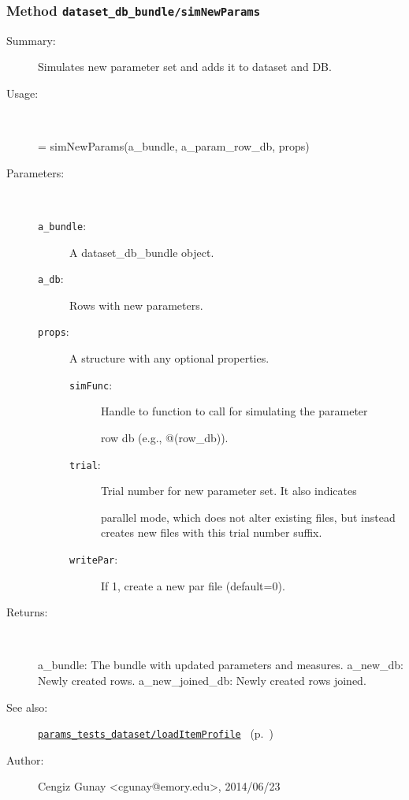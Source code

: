 \subsubsection[Method \texttt{simNewParams}]{Method \texttt{dataset\_db\_bundle/simNewParams}}%
%
\label{ref_dataset_db_bundle__simNewParams}%
\hypertarget{ref_dataset_db_bundle__simNewParams}{}%
\begin{description}
\item[Summary:]Simulates new parameter set and adds it to dataset and DB.
%
\item[Usage:]~%
\begin{lyxcode}%
[a\_bundle, a\_new\_db, a\_new\_joined\_db] = simNewParams(a\_bundle, a\_param\_row\_db, props)
%
\end{lyxcode}%
%
%
\item[Parameters:]~
\begin{description}%
\item[\texttt{a\_bundle}:]
 A dataset\_db\_bundle object.
\item[\texttt{a\_db}:]
 Rows with new parameters.
\item[\texttt{props}:]
 A structure with any optional properties.
\begin{description}%
\item[\texttt{simFunc}:]
 Handle to function to call for simulating the parameter

row db (e.g., @(row\_db)).
\item[\texttt{trial}:]
 Trial number for new parameter set. It also indicates

parallel mode, which does not alter existing files, but instead
creates new files with this trial number suffix.
\item[\texttt{writePar}:]
 If 1, create a new par file (default=0).
\end{description}%
\end{description}%
%
\item[Returns:
]~

   a\_bundle: The bundle with updated parameters and measures.
   a\_new\_db: Newly created rows.
   a\_new\_joined\_db: Newly created rows joined.
%
%
\item[See also:]%
\hyperlink{ref_params_tests_dataset__loadItemProfile}{\texttt{params\_tests\_dataset/loadItemProfile}}%
\ (p.~\pageref{ref_params_tests_dataset__loadItemProfile})%
%
%
\item[Author:]%
Cengiz Gunay <cgunay@emory.edu>, 2014/06/23
%
\end{description}
\methodline%
